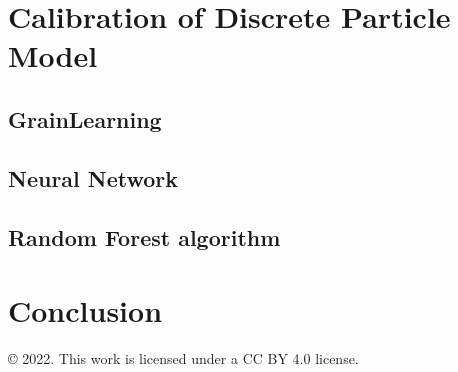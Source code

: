 \documentclass{article}
\begin{document}


\section{Calibration of Discrete Particle Model}\label{section:Calibration}
    
\subsection{GrainLearning}\label{section:GLtheory}



\subsection{Neural Network}


\subsection{Random Forest algorithm}








\section{Conclusion} 


\pagebreak 





\begin{center}
© 2022. This work is licensed under a CC BY 4.0 license. 
\end{center}
\end{document}

